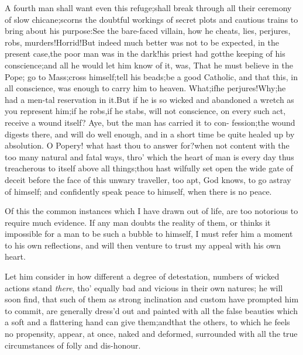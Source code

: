 \documentclass{article}
\begin{document}
\begin{story}{A fourth man shall want even this}
refuge;\tsk shall break through all their ceremony of slow
chicane;\tsk scorns the doubtful workings of secret plots and
cautious trains to bring about his purpose:\tsh See the
bare-faced villain, how he cheats, lies, perjures, robs,
murders!\tsh Horrid!\tsh But indeed much better was not to be
expected, in the present case,\tsk the poor man was in the
dark!\tsh his priest had got\pb the keeping of his
conscience;\tsh and all he would let him know of it, was,
That he must believe in the Pope;\tsk\break
    go to Mass;\tsk cross
himself;\tsk tell his beads;\tsh be a good Catholic, and that
this, in all conscience, was enough to carry him to heaven.
What;\tsk if\break he perjures!\tsk Why;\tsk he had a men-\break tal
reservation in it.\tsk But if he is so wicked and abandoned a
wretch as you represent him;\tsk if he robs,\tsk if he
    stabs,\tsk 
will not conscience, on every such act, receive a wound
itself? Aye,\break
    \tsk but the man has carried it to con-\break
    fession;\tsk the wound digests there,\break
    and will do well enough, and in a\break
    short time be quite healed up by absolution. O Popery!
what hast thou to answer for?\tsk when not content with
the too many natural and fatal ways, thro’ which the heart of
man is\pb 
    every day thus treacherous to itself\break
    above all things;\tsk thou hast wilfully set open the wide gate of deceit
before the face of this unwary traveller, too apt, God knows, to go
astray of himself; and confidently speak peace to himself, when
there is no peace.
\end{story}
\vspace\parskip
\begin{story}{Of this the common instances which}
    I have drawn out of life, are too notorious to require much
    evidence. If any man doubts the reality of them, or thinks
    it impossible for a man to be such a bubble to himself,\tsk
    I must refer him a moment to his own reflections, and will
    then venture to trust my appeal with his own heart.  
\end{story}
\vspace\parskip
\begin{story}{Let him consider in how different} a degree of
detestation, numbers of\break
    wicked actions stand \textit{there}, tho’ equally\pb
    bad and vicious in their own natures;\break
    \tsk he will soon find, that such of them as strong inclination and custom
have prompted him to commit, are generally dress’d out and painted
with all the false beauties which a soft and a flattering hand can
give them;\tsk and\break that the others, to which he feels no
propensity, appear, at once, naked and deformed, surrounded with
all the\break
    true circumstances of folly and dis-\break honour.
\end{story}
\end{document}
